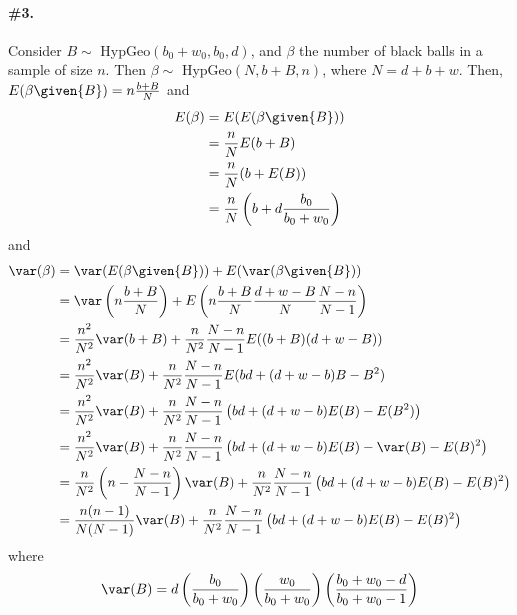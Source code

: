 \documentclass[12pt,titlepage]{article}\usepackage{graphicx, color}
\begin{document}
\paragraph{\#3.} Consider $B \sim$ HypGeo$(b_0 + w_0, b_0, d)$, and $\beta$ the number of black balls in a sample of size $n$. Then $\beta \sim$ HypGeo$(N, b+B, n)$, where $N= d + b+ w$. Then, $E(\beta \given{B}) = n \frac{b+B}{N}$ and
\begin{align*}
 E(\beta) &= E(E(\beta\given{B})) \\
&= \frac{n}{N}E(b+B) \\
&= \frac{n}{N}(b + E(B)) \\
&= \frac{n}{N}\left(b + d\frac{b_0}{b_0+w_0}\right)
\end{align*}
and
\begin{align*}
\var(\beta) &= \var(E(\beta\given{B})) + E(\var(\beta\given{B})) \\
&= \var\left(n\frac{b+B}{N}\right) + E\left( n \frac{b+B}{N}\frac{d+w-B}{N}{\frac{N-n}{N-1}} \right) \\
&= \frac{n^2}{N^2}\var(b+B) + \frac{n}{N^2}{\frac{N-n}{N-1}} E((b+B)(d+w-B)) \\
&=\frac{n^2}{N^2}\var(B) + \frac{n}{N^2}{\frac{N-n}{N-1}}  E(bd +(d+w-b)B-B^2) \\
&= \frac{n^2}{N^2}\var(B) + \frac{n}{N^2}{\frac{N-n}{N-1}} \left( bd +(d+w-b)E(B)-E(B^2)\right) \\
&= \frac{n^2}{N^2}\var(B) + \frac{n}{N^2}{\frac{N-n}{N-1}} \left( bd +(d+w-b)E(B)-\var(B) - E(B)^2\right) \\
&=\frac{n}{N^2}\left(n - \frac{N-n}{N-1}\right)\var(B) + \frac{n}{N^2}{\frac{N-n}{N-1}} \left( bd +(d+w-b)E(B) - E(B)^2\right) \\
&=\frac{n(n-1)}{N(N-1)}\var(B) + \frac{n}{N^2}{\frac{N-n}{N-1}} \left( bd +(d+w-b)E(B) - E(B)^2\right)
\end{align*}
where
\[
\var(B) = d \left(\frac{b_0}{b_0+w_0}\right) \left(\frac{w_0}{b_0 + w_0}\right) \left(\frac{b_0 + w_0 - d}{b_0 + w_0 -1} \right)
\]
\end{document}
